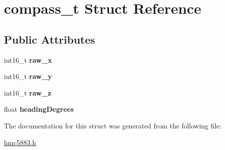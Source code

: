 \hypertarget{structcompass__t}{}\section{compass\+\_\+t Struct Reference}
\label{structcompass__t}
\subsection*{Public Attributes}
\begin{DoxyCompactItemize}
\item 
\mbox{\label{structcompass__t_aaa5323135e100dea4ba14a5e3d1dc555}} 
int16\+\_\+t {\bfseries raw\+\_\+x}
\item 
\mbox{\label{structcompass__t_a719b0ea8a5f9dda8804bf91b98d8cedf}} 
int16\+\_\+t {\bfseries raw\+\_\+y}
\item 
\mbox{\label{structcompass__t_ae7828390c86ad613fd89fa84526dc555}} 
int16\+\_\+t {\bfseries raw\+\_\+z}
\item 
\mbox{\label{structcompass__t_ac4778441994a1a67998c2fd2c3c422f1}} 
float {\bfseries heading\+Degrees}
\end{DoxyCompactItemize}


The documentation for this struct was generated from the following file\+:\begin{DoxyCompactItemize}
\item 
\hyperlink{hmc5883_8h}{hmc5883.\+h}\end{DoxyCompactItemize}
